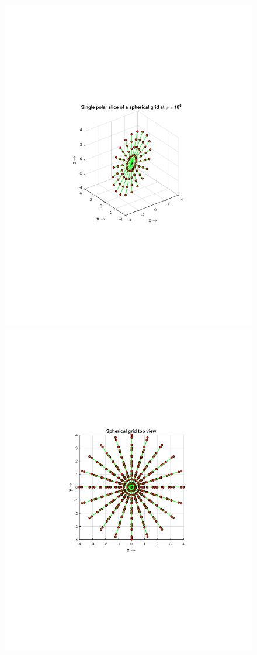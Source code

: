 \documentclass{UCF_ETD}
\begin{document}
\begin{figure}[H]
\begin{center}
\includegraphics[scale=0.7]{RobustRegistration/Single18PolarGrid}
\includegraphics[scale=0.7]{RobustRegistration/SphericalGridTopView}

\end{center}
\end{figure}
\end{document}
